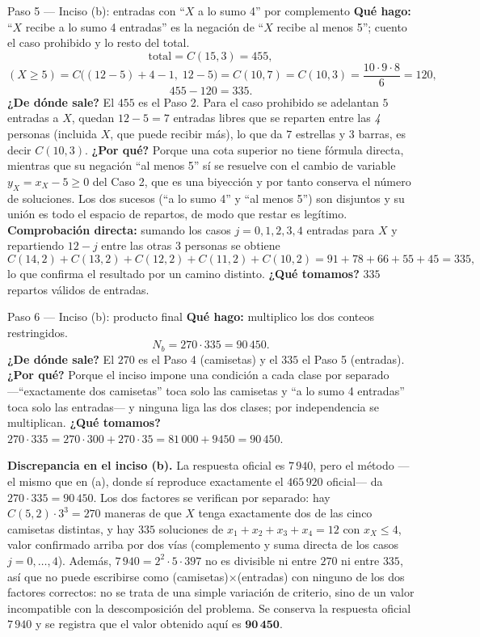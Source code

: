 \documentclass[11pt]{article}
\begin{document}
\begin{paso}{Paso 5 --- Inciso (b): entradas con ``$X$ a lo sumo 4'' por complemento}
\textbf{Qué hago:} ``$X$ recibe a lo sumo 4 entradas'' es la negación de ``$X$ recibe al menos 5''; cuento el caso prohibido y lo resto del total.
\[
\text{total}=C(15,3)=455,
\]
\[
(X\ge 5)=C\bigl((12-5)+4-1,\;12-5\bigr)=C(10,7)=C(10,3)=\frac{10\cdot9\cdot8}{6}=120 ,
\]
\[
455-120=335 .
\]
\textbf{¿De dónde sale?} El $455$ es el Paso 2. Para el caso prohibido se adelantan $5$ entradas a $X$, quedan $12-5=7$ entradas libres que se reparten entre las \emph{4} personas (incluida $X$, que puede recibir más), lo que da $7$ estrellas y $3$ barras, es decir $C(10,3)$.
\textbf{¿Por qué?} Porque una cota superior no tiene fórmula directa, mientras que su negación ``al menos 5'' sí se resuelve con el cambio de variable $y_X=x_X-5\ge0$ del Caso 2, que es una biyección y por tanto conserva el número de soluciones. Los dos sucesos (``a lo sumo 4'' y ``al menos 5'') son disjuntos y su unión es todo el espacio de repartos, de modo que restar es legítimo.
\textbf{Comprobación directa:} sumando los casos $j=0,1,2,3,4$ entradas para $X$ y repartiendo $12-j$ entre las otras $3$ personas se obtiene
\[
C(14,2)+C(13,2)+C(12,2)+C(11,2)+C(10,2)=91+78+66+55+45=335 ,
\]
lo que confirma el resultado por un camino distinto.
\textbf{¿Qué tomamos?} $335$ repartos válidos de entradas.
\end{paso}

\begin{paso}{Paso 6 --- Inciso (b): producto final}
\textbf{Qué hago:} multiplico los dos conteos restringidos.
\[
N_b=270\cdot 335=90\,450 .
\]
\textbf{¿De dónde sale?} El $270$ es el Paso 4 (camisetas) y el $335$ el Paso 5 (entradas).
\textbf{¿Por qué?} Porque el inciso impone una condición a cada clase por separado —``exactamente dos camisetas'' toca solo las camisetas y ``a lo sumo 4 entradas'' toca solo las entradas— y ninguna liga las dos clases; por independencia se multiplican.
\textbf{¿Qué tomamos?} $270\cdot 335=270\cdot 300+270\cdot 35=81\,000+9450=90\,450$.
\end{paso}

\begin{nota}
\textbf{Discrepancia en el inciso (b).} La respuesta oficial es $7\,940$, pero el método —el mismo que en (a), donde sí reproduce exactamente el $465\,920$ oficial— da $270\cdot 335=90\,450$. Los dos factores se verifican por separado: hay $C(5,2)\cdot 3^3=270$ maneras de que $X$ tenga exactamente dos de las cinco camisetas distintas, y hay $335$ soluciones de $x_1+x_2+x_3+x_4=12$ con $x_X\le 4$, valor confirmado arriba por dos vías (complemento y suma directa de los casos $j=0,\ldots,4$). Además, $7\,940=2^2\cdot5\cdot397$ no es divisible ni entre $270$ ni entre $335$, así que no puede escribirse como (camisetas)$\times$(entradas) con ninguno de los dos factores correctos: no se trata de una simple variación de criterio, sino de un valor incompatible con la descomposición del problema. Se conserva la respuesta oficial $7\,940$ y se registra que el valor obtenido aquí es $\mathbf{90\,450}$.
\end{nota}
\end{document}
